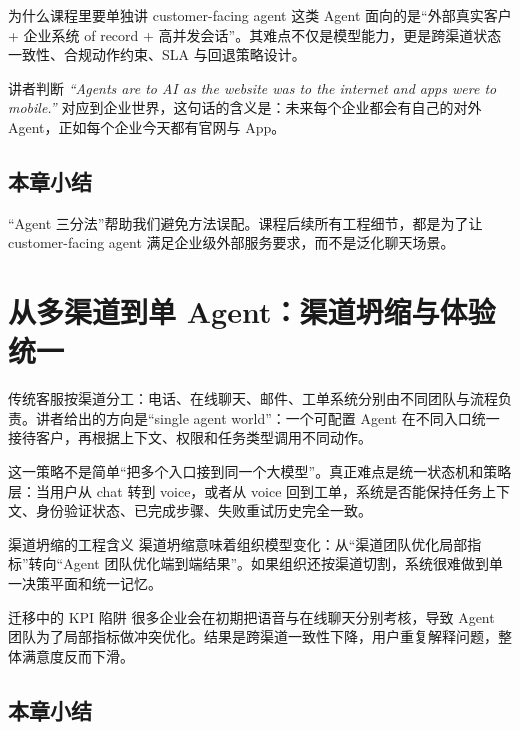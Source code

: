 \documentclass[a4paper]{article}
\begin{document}
\begin{knowledgebox}{为什么课程里要单独讲 customer-facing agent}
这类 Agent 面向的是“外部真实客户 + 企业系统 of record + 高并发会话”。其难点不仅是模型能力，更是跨渠道状态一致性、合规动作约束、SLA 与回退策略设计。
\end{knowledgebox}

\begin{importantbox}{讲者判断}
\textit{``Agents are to AI as the website was to the internet and apps were to mobile.''}
对应到企业世界，这句话的含义是：未来每个企业都会有自己的对外 Agent，正如每个企业今天都有官网与 App。
\end{importantbox}

\subsection{本章小结}

“Agent 三分法”帮助我们避免方法误配。课程后续所有工程细节，都是为了让 customer-facing agent 满足企业级外部服务要求，而不是泛化聊天场景。

\section{从多渠道到单 Agent：渠道坍缩与体验统一}

传统客服按渠道分工：电话、在线聊天、邮件、工单系统分别由不同团队与流程负责。讲者给出的方向是“single agent world”：一个可配置 Agent 在不同入口统一接待客户，再根据上下文、权限和任务类型调用不同动作。

这一策略不是简单“把多个入口接到同一个大模型”。真正难点是统一状态机和策略层：当用户从 chat 转到 voice，或者从 voice 回到工单，系统是否能保持任务上下文、身份验证状态、已完成步骤、失败重试历史完全一致。

\begin{importantbox}{渠道坍缩的工程含义}
渠道坍缩意味着组织模型变化：从“渠道团队优化局部指标”转向“Agent 团队优化端到端结果”。如果组织还按渠道切割，系统很难做到单一决策平面和统一记忆。
\end{importantbox}

\begin{warningbox}{迁移中的 KPI 陷阱}
很多企业会在初期把语音与在线聊天分别考核，导致 Agent 团队为了局部指标做冲突优化。结果是跨渠道一致性下降，用户重复解释问题，整体满意度反而下滑。
\end{warningbox}

\subsection{本章小结}
\end{document}
